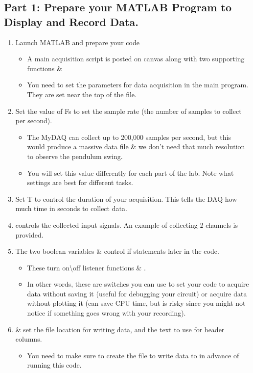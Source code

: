 \documentclass{article}
\begin{document}
\subsection{Part 1: Prepare your MATLAB Program to Display and Record Data.}
\begin{enumerate}
    \item Launch MATLAB and prepare your code
    \begin{itemize}
        \item A main acquisition script  is posted on canvas along with two supporting functions  \& 
        \item You need to set the parameters for data acquisition in the main program. They are set near the top of the file.
    \end{itemize} 
    \item Set the value of Fs to set the sample rate (the number of samples to collect per second). 
    \begin{itemize}
        \item The MyDAQ can collect up to 200,000 samples per second, but this would produce a massive data file \& we don't need that much resolution to observe the pendulum swing. 
        \item You will set this value differently for each part of the lab. Note what settings are best for different tasks. 
    \end{itemize}
    \item Set T to control the duration of your acquisition. This tells the DAQ how much time in seconds to collect data.
    \item {} controls the collected input signals. An example of collecting 2 channels is provided.
    \item The two boolean variables  \&  control if statements later in the code.
    \begin{itemize}
        \item These turn on\textbackslash off listener functions  \& . 
        \item In other words, these are switches you can use to set your code to acquire data without saving it (useful for debugging your circuit) or acquire data without plotting it (can save CPU time, but is risky since you might not notice if something goes wrong with your recording). 
    \end{itemize}  
    \item {} \&  set the file location for writing data, and the text to use for header columns. 
    \begin{itemize}
        \item You need to make sure to create the  file to write data to in advance of running this code.
    \end{itemize}
\end{enumerate}
\end{document}
